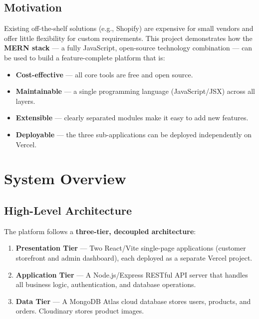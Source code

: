\documentclass[12pt,a4paper]{report}
\begin{document}
\section{Motivation}

Existing off-the-shelf solutions (e.g., Shopify) are expensive for small vendors and offer little
flexibility for custom requirements.
This project demonstrates how the \textbf{MERN stack} — a fully JavaScript, open-source technology
combination — can be used to build a feature-complete platform that is:

\begin{itemize}[leftmargin=*, label=\textbullet]
  \item \textbf{Cost-effective} — all core tools are free and open source.
  \item \textbf{Maintainable} — a single programming language (JavaScript/JSX) across all layers.
  \item \textbf{Extensible} — clearly separated modules make it easy to add new features.
  \item \textbf{Deployable} — the three sub-applications can be deployed independently on Vercel.
\end{itemize}

\chapter{System Overview}

\section{High-Level Architecture}

The platform follows a \textbf{three-tier, decoupled architecture}:

\begin{enumerate}[leftmargin=*, label=\arabic*.]
  \item \textbf{Presentation Tier} — Two React/Vite single-page applications (customer storefront and
        admin dashboard), each deployed as a separate Vercel project.
  \item \textbf{Application Tier} — A Node.js/Express RESTful API server that handles all business
        logic, authentication, and database operations.
  \item \textbf{Data Tier} — A MongoDB Atlas cloud database stores users, products, and orders.
        Cloudinary stores product images.
\end{enumerate}
\end{document}
